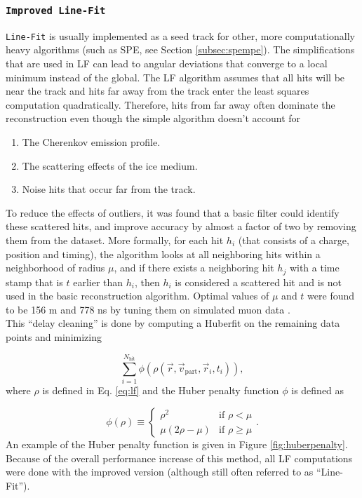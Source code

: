\subsubsection{\texttt{Improved Line-Fit}}
\texttt{Line-Fit} is usually implemented as a seed track for other, more computationally heavy algorithms (such as SPE, see Section \ref{subsec:spempe}). The simplifications that are used in LF can lead to angular deviations that converge to a local minimum instead of the global. The LF algorithm assumes that all hits will be near the track and hits far away from the track enter the least squares computation quadratically. Therefore, hits from far away often dominate the reconstruction even though the simple algorithm doesn't account for 

\vspace{2mm}
\begin{enumerate}
\item The Cherenkov emission profile.
\item The scattering effects of the ice medium.
\item Noise hits that occur far from the track.
\end{enumerate}
\vspace{2mm}

\noindent To reduce the effects of outliers, it was found that a basic filter could identify these scattered hits, and improve accuracy by almost a factor of two by removing them from the dataset. More formally, for each hit $h_i$ (that consists of a charge, position and timing), the algorithm looks at all neighboring hits within a neighborhood of radius $\mu$, and if there exists a neighboring hit $h_j$ with a time stamp that is $t$ earlier than $h_i$, then $h_i$ is considered a scattered hit and is not used in the basic reconstruction algorithm. Optimal values of $\mu$ and $t$ were found to be 156 m and 778 ns by tuning them on simulated muon data \cite{Aartsen:2013bfa}.\\

\noindent This ``delay cleaning'' is done by computing a Huberfit on the remaining data points and minimizing

\begin{equation}
\sum^{N_{\textrm{hit}}}_{i=1} \phi(\rho(\vec{r},\vec{v}_\textrm{part},\vec{r}_i,t_i)),
\end{equation}
\noindent where $\rho$ is defined in Eq. \ref{eq:lf} and the Huber penalty function $\phi$ is defined as

\begin{equation}
\phi(\rho) \equiv \left\{
    \begin{array}{ll}
        \rho^2 &\textrm{if } \rho < \mu \\
        \mu\left(2\rho - \mu\right) & \textrm{if }\rho \geq \mu
    \end{array}
    \right.
    .
\end{equation}
\noindent An example of the Huber penalty function is given in Figure \ref{fig:huberpenalty}. Because of the overall performance increase of this method, all LF computations were done with the improved version (although still often referred to as ``Line-Fit'').

